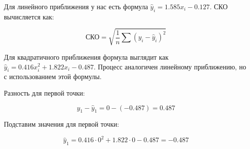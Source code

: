 \documentclass{article}
\begin{document}
            Для линейного приближения у нас есть формула \(\hat{y}_i = 1.585x_i - 0.127\). СКО вычисляется как:

            \[
            \text{СКО} = \sqrt{\frac{1}{n} \sum (y_i - \hat{y}_i)^2}
            \]

            Для квадратичного приближения формула выглядит как \(\hat{y}_i = 0.416x_i^2 + 1.822x_i - 0.487\). Процесс аналогичен линейному приближению, но с использованием этой формулы.
            
            Разность для первой точки:

            \[
            y_1 - \hat{y}_1 = 0 - (-0.487) = 0.487
            \]

            Подставим значения для первой точки:

            \[
            \hat{y}_1 = 0.416 \cdot 0^2 + 1.822 \cdot 0 - 0.487 = -0.487
            \]
\end{document}
